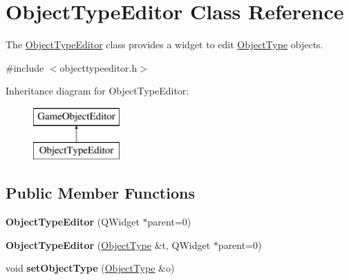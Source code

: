 \hypertarget{class_object_type_editor}{\section{\-Object\-Type\-Editor \-Class \-Reference}
\label{class_object_type_editor}
}


\-The \hyperlink{class_object_type_editor}{\-Object\-Type\-Editor} class provides a widget to edit \hyperlink{class_object_type}{\-Object\-Type} objects.  




{\ttfamily \#include $<$objecttypeeditor.\-h$>$}

\-Inheritance diagram for \-Object\-Type\-Editor\-:\begin{figure}[H]
\begin{center}
\leavevmode
\includegraphics[height=2.000000cm]{class_object_type_editor}
\end{center}
\end{figure}
\subsection*{\-Public \-Member \-Functions}
\begin{DoxyCompactItemize}
\item 
\hypertarget{class_object_type_editor_aabc519e9a1bd275a83bd06f46a165001}{{\bfseries \-Object\-Type\-Editor} (\-Q\-Widget $\ast$parent=0)}\label{class_object_type_editor_aabc519e9a1bd275a83bd06f46a165001}

\item 
\hypertarget{class_object_type_editor_a80adc378e48ff9f10fbfb6a3671110a2}{{\bfseries \-Object\-Type\-Editor} (\hyperlink{class_object_type}{\-Object\-Type} \&t, \-Q\-Widget $\ast$parent=0)}\label{class_object_type_editor_a80adc378e48ff9f10fbfb6a3671110a2}

\item 
\hypertarget{class_object_type_editor_aa9953a9278d06d168d0d5c2febb88601}{void {\bfseries set\-Object\-Type} (\hyperlink{class_object_type}{\-Object\-Type} \&o)}\label{class_object_type_editor_aa9953a9278d06d168d0d5c2febb88601}

\end{DoxyCompactItemize}


